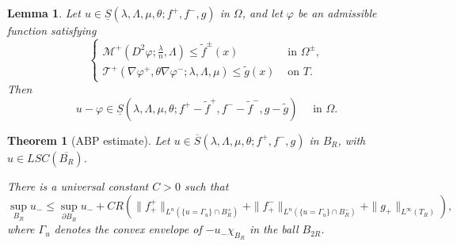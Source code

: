 \documentclass[10pt,a4paper]{amsart}
\newtheorem{lem}{Lemma}
\newtheorem{thm}{Theorem}
\newcommand{\chara}[1]{\chi_{#1}}
\newcommand{\lowers}{LSC}
\newcommand{\mcal}{\mathcal{M}}
\newcommand{\tcal}{\mathcal{T}}
\begin{document}
\begin{lem}
\label{lem:aux}
Let $u \in \underline{S}(\lambda,\Lambda,\mu,\theta; f^{+}, f^{-}, g)$ in $\Omega$, and let $\varphi$ be an admissible function satisfying
\[
\begin{cases}
\mcal^{+}(D^2 \varphi; \frac{\lambda}{n}, \Lambda) \leq \widetilde{f}^{\pm}(x) & \text{ in } \Omega^{\pm},\\
\tcal^{+}(\nabla \varphi^{+}, \theta \nabla \varphi^{-}; \lambda, \Lambda, \mu) \leq \widetilde{g}(x) & \text{ on } T.
\end{cases}
\]
Then
\[
u - \varphi \in \underline{S}(\lambda,\Lambda,\mu,\theta; f^{+}- \widetilde{f}^{+}, f^{-}- \widetilde{f}^{-}, g - \widetilde{g}) \quad \text{ in } \Omega.
\]
\end{lem}

\begin{thm}[ABP estimate]
\label{thm:abp}
Let $u \in \overline{S}(\lambda,\Lambda,\mu, \theta; f^{+}, f^{-}, g)$ in $B_R$, with $u \in \lowers(\overline{B_R})$.

There is a universal constant $C > 0$ such that
\[
\sup_{B_R} u_{-} \leq \sup_{\partial B_R} u_{-} + C R \left( 
 \|f^{+}_{+}\|_{L^{n}(\{u = \Gamma_u\} \cap B_R^{+})} + \|f^{-}_{+}\|_{L^{n}(\{u = \Gamma_u\} \cap B_R^{-})}+ \|g_{+}\|_{L^{\infty}(T_R)}
 \right),
\]
where $\Gamma_u$ denotes the convex envelope of $- u_{-} \chara{B_R}$ in the ball $B_{2R}$.
\end{thm}
\end{document}
